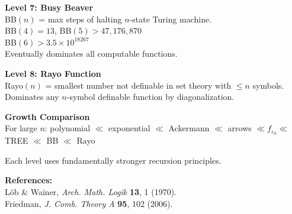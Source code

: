 \begin{technical}
\textbf{Level 7: Busy Beaver}\\
BB$(n)$ = max steps of halting $n$-state Turing machine.\\
BB$(4) = 13$, BB$(5) > 47{,}176{,}870$\\
BB$(6) > 3.5 \times 10^{18267}$\\
Eventually dominates all computable functions.

\textbf{Level 8: Rayo Function}\\
Rayo$(n)$ = smallest number not definable in set theory with $\leq n$ symbols.\\
Dominates any $n$-symbol definable function by diagonalization.

\textbf{Growth Comparison}\\
For large $n$: polynomial $\ll$ exponential $\ll$ Ackermann $\ll$ arrows $\ll f_{\varepsilon_0} \ll$ TREE $\ll$ BB $\ll$ Rayo

Each level uses fundamentally stronger recursion principles.

\vspace{0.5em}
\textbf{References:}\\
Löb \& Wainer, \textit{Arch. Math. Logik} \textbf{13}, 1 (1970).\\
Friedman, \textit{J. Comb. Theory A} \textbf{95}, 102 (2006).
\end{technical}